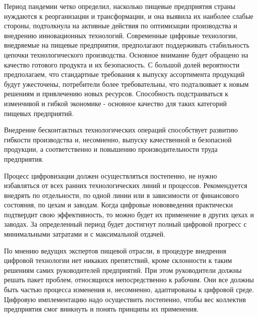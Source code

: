 Период пандемии четко определил, насколько пищевые предприятия страны
нуждаются к реорганизации и трансформации, и она выявила их наиболее
слабые стороны, подтолкнула на активные действия по оптимизации
производства и внедрению инновационных технологий. Современные цифровые
технологии, внедряемые на пищевые предприятия, предполагают поддерживать
стабильность цепочки технологического производства. Основное внимание
будет обращено на качество готового продукта и их безопасность. С
большой долей вероятности предполагаем, что стандартные требования к
выпуску ассортимента продукций будут ужесточены, потребители более
требовательны, что подталкивает к новым решениям и привлечению новых
ресурсов. Способность подстраиваться к изменчивой и гибкой экономике -
основное качество для таких категорий пищевых предприятий.

Внедрение бесконтактных технологических операций способствует развитию
гибкости производства и, несомненно, выпуску качественной и безопасной
продукции, а соответственно и повышению производительности труда
предприятия.

Процесс цифровизации должен осуществляться постепенно, не нужно
избавляться от всех ранних технологических линий и процессов.
Рекомендуется внедрять по отдельности, по одной линии или в зависимости
от финансового состояния, по цехам и заводам. Когда цифровые
нововведения практически подтвердит свою эффективность, то можно будет
их применение в других цехах и заводах. За определенный период будет
достигнут полный цифровой прогресс с минимальными затратами и с
максимальной отдачей.

По мнению ведущих экспертов пищевой отрасли, в процедуре внедрения
цифровой технологии нет никаких препятствий, кроме склонности к таким
решениям самих руководителей предприятий. При этом руководители должны
решать пакет проблем, относящихся непосредственно к рабочим. Они все
должны быть частью процесса изменения и, несомненно, адаптированы к
цифровой среде. Цифровую имплементацию надо осуществить постепенно,
чтобы вес коллектив предприятия смог вникнуть и понять принципы их
применения.

